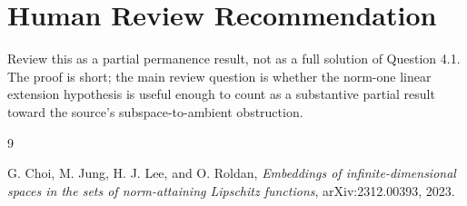 \documentclass[11pt]{article}
\begin{document}
\section*{Human Review Recommendation}

Review this as a partial permanence result, not as a full solution of Question
4.1.  The proof is short; the main review question is whether the norm-one
linear extension hypothesis is useful enough to count as a substantive
partial result toward the source's subspace-to-ambient obstruction.

\begin{thebibliography}{9}

G. Choi, M. Jung, H. J. Lee, and O. Roldan,
\emph{Embeddings of infinite-dimensional spaces in the sets of norm-attaining
Lipschitz functions},
arXiv:2312.00393, 2023.

\end{thebibliography}
\end{document}
